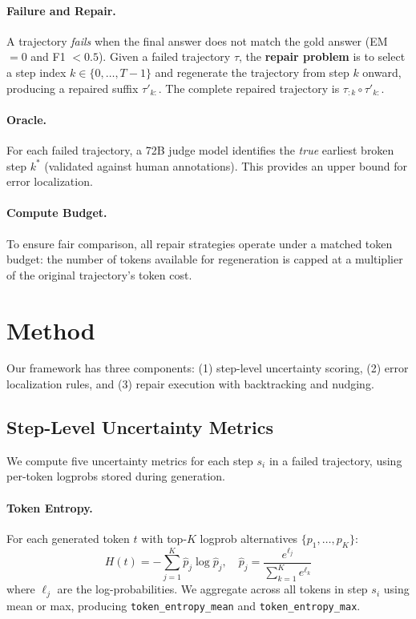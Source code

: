 \documentclass[letterpaper]{article}
\begin{document}
\paragraph{Failure and Repair.} A trajectory \emph{fails} when the final answer does not match the gold answer (EM $= 0$ and F1 $< 0.5$). Given a failed trajectory $\tau$, the \textbf{repair problem} is to select a step index $k \in \{0, \ldots, T-1\}$ and regenerate the trajectory from step $k$ onward, producing a repaired suffix $\tau'_{k:}$. The complete repaired trajectory is $\tau_{:k} \circ \tau'_{k:}$.

\paragraph{Oracle.} For each failed trajectory, a 72B judge model identifies the \emph{true} earliest broken step $k^*$ (validated against human annotations). This provides an upper bound for error localization.

\paragraph{Compute Budget.} To ensure fair comparison, all repair strategies operate under a matched token budget: the number of tokens available for regeneration is capped at a multiplier of the original trajectory's token cost.

\section{Method}

Our framework has three components: (1) step-level uncertainty scoring, (2) error localization rules, and (3) repair execution with backtracking and nudging.

\subsection{Step-Level Uncertainty Metrics}

We compute five uncertainty metrics for each step $s_i$ in a failed trajectory, using per-token logprobs stored during generation.

\paragraph{Token Entropy.} For each generated token $t$ with top-$K$ logprob alternatives $\{p_1, \ldots, p_K\}$:
\begin{equation}
  H(t) = -\sum_{j=1}^{K} \hat{p}_j \log \hat{p}_j, \quad \hat{p}_j = \frac{e^{\ell_j}}{\sum_{k=1}^{K} e^{\ell_k}}
\end{equation}
where $\ell_j$ are the log-probabilities. We aggregate across all tokens in step $s_i$ using mean or max, producing \texttt{token\_entropy\_mean} and \texttt{token\_entropy\_max}.
\end{document}
